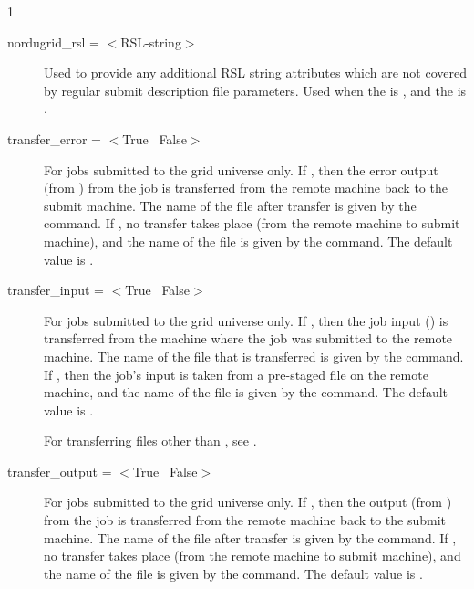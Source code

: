 \begin{ManPage}{\label{man-condor-submit}}{1}
\begin{description}

\item[nordugrid\_rsl = $<$RSL-string$>$]
Used to provide any additional RSL
string attributes which are not covered by regular submit description
file parameters. Used when the  is ,
and the  is .


\item[transfer\_error = $<$True \Bar\ False$>$]
For jobs submitted to the grid universe only.
If , then the error output (from ) from the job
is transferred from the remote machine back to the submit machine.
The name of the file after transfer is given
by the  command.
If , no transfer takes place (from the remote machine
to submit machine),
and the name of the file is given
by the  command.
The default value is .

\item[transfer\_input = $<$True \Bar\ False$>$]
For jobs submitted to the grid universe only.
If , then the job input () is transferred
from the machine where the job was submitted to the remote machine.
The name of the file that is transferred is given by the
 command.
If , then the job's input is taken from a pre-staged
file on the remote machine, and
the name of the file is given by the  command.
The default value is .

For transferring files other than ,
see .

\item[transfer\_output = $<$True \Bar\ False$>$]
For jobs submitted to the grid universe only.
If , then the output (from ) from the job
is transferred from the remote machine back to the submit machine.
The name of the file after transfer is given
by the  command.
If , no transfer takes place (from the remote machine
to submit machine),
and the name of the file is given
by the  command.
The default value is .


\end{description}
\end{ManPage}
